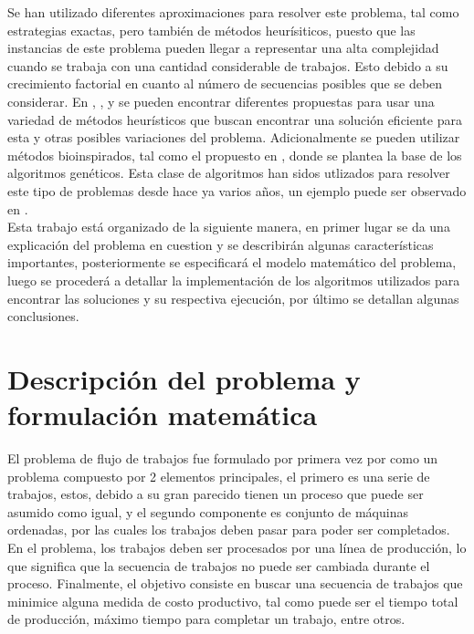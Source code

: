 \documentclass[10pt, twoside]{article}
\begin{document}
Se han utilizado diferentes aproximaciones para resolver este problema, tal como
estrategias exactas, pero también de métodos heurísiticos, puesto que las
instancias de este problema pueden llegar a representar una alta complejidad
cuando se trabaja con una cantidad considerable de trabajos. Esto debido a su
crecimiento factorial en cuanto al número de secuencias posibles que se deben
considerar. En \cite{heuristico4}, \cite{heuristico1}, \cite{heuristico2} y
\cite{heuristico3} se pueden encontrar diferentes propuestas para usar una
variedad de métodos heurísticos que buscan encontrar una solución eficiente
para esta y otras posibles variaciones del problema. Adicionalmente se
pueden utilizar métodos bioinspirados, tal como el propuesto en \cite{genetic1},
donde se plantea la base de los algoritmos genéticos. Esta clase de algoritmos
han sidos utlizados para resolver este tipo de problemas desde hace ya varios
años, un ejemplo puede ser observado en \cite{genetic3}.\\

Esta trabajo está organizado de la siguiente manera, en primer lugar
se da una explicación del problema en cuestion y se describirán algunas
características importantes, posteriormente se especificará el modelo
matemático del problema, luego se procederá a detallar la implementación de los
algoritmos utilizados para encontrar las soluciones y su respectiva ejecución,
por último se detallan algunas conclusiones.\\

\section{Descripción del problema y formulación matemática}\label{sec_mathmod}

El problema de flujo de trabajos fue formulado por primera vez por \cite{original}
como un problema compuesto por 2 elementos principales, el primero es una serie
de trabajos, estos, debido a su gran parecido tienen un proceso que puede ser
asumido como igual, y el segundo componente es conjunto de máquinas ordenadas,
por las cuales los trabajos deben pasar para poder ser completados. En el problema,
los trabajos deben ser procesados por una línea de producción, lo que significa
que la secuencia de trabajos no puede ser cambiada durante el proceso.
Finalmente, el objetivo consiste en buscar una secuencia de trabajos que
minimice alguna medida de costo productivo, tal como puede ser el tiempo total
de producción, máximo tiempo para completar un trabajo, entre otros.
\\
\end{document}
